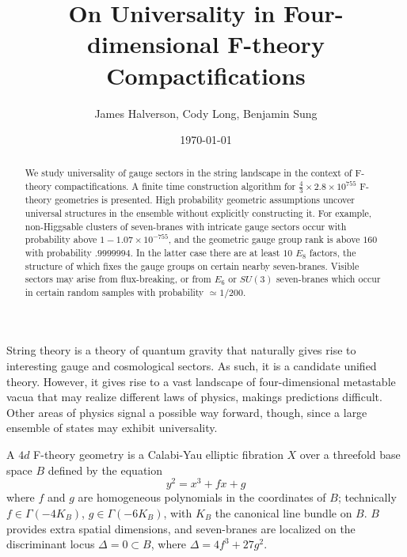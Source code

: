 \documentclass[aps,prl,twocolumn, superscriptaddress,groupedaddress,nofootinbib]{revtex4}
\begin{document}
\title{On Universality in Four-dimensional F-theory Compactifications}
\author{James Halverson, Cody Long, Benjamin Sung}

\date{\today}

\begin{abstract}
We study universality of gauge sectors in the string landscape
in the context of F-theory compactifications.
A finite time construction algorithm for $\frac43 \times 2.8 \times 10^{755}$ F-theory geometries is presented. High probability geometric
assumptions uncover universal structures in the ensemble without
explicitly constructing it. For example, non-Higgsable clusters
of seven-branes with intricate gauge sectors occur with
probability above $1-1.07\times 10^{-755}$,  and
the geometric gauge group rank is above $160$ with probability
$.9999994$. In the latter case there are at least $10$ $E_8$
factors, the structure of which fixes the gauge groups
on certain nearby seven-branes. Visible sectors may arise from
flux-breaking, or from $E_6$ or $SU(3)$ seven-branes which occur
in certain random samples with probability $\simeq 1/200$.
\end{abstract}

\maketitle


String theory is a theory of quantum gravity that naturally
gives rise to interesting gauge and cosmological sectors. As
such, it is a candidate unified theory. However, it gives
rise to a vast landscape of four-dimensional metastable vacua that
may realize different laws of physics, makings predictions difficult.
Other areas of physics signal a possible way forward, though,
since a large ensemble of states may exhibit universality.

\vspace{.2cm}
A $4d$ F-theory geometry is a Calabi-Yau elliptic fibration
$X$ over a threefold base space $B$ defined by the equation
\begin{equation}
y^2=x^3+f x + g
\end{equation}
where $f$ and $g$ are homogeneous polynomials in the coordinates
of $B$; technically $f\in \Gamma(-4K_B)$, $g\in \Gamma(-6K_B)$,
with $K_B$ the canonical line bundle on $B$. $B$ provides extra spatial dimensions, and seven-branes are localized on the discriminant locus
$\Delta=0\subset B$, where $\Delta = 4f^3+27g^2$.
\end{document}
